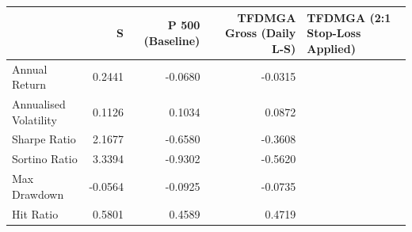 \begin{tabular}{lrrr}
\toprule
 & S&P 500 (Baseline) & TFDMGA Gross (Daily L-S) & TFDMGA (2:1 Stop-Loss Applied) \\
\midrule
Annual Return & 0.2441 & -0.0680 & -0.0315 \\
Annualised Volatility & 0.1126 & 0.1034 & 0.0872 \\
Sharpe Ratio & 2.1677 & -0.6580 & -0.3608 \\
Sortino Ratio & 3.3394 & -0.9302 & -0.5620 \\
Max Drawdown & -0.0564 & -0.0925 & -0.0735 \\
Hit Ratio & 0.5801 & 0.4589 & 0.4719 \\
\bottomrule
\end{tabular}
